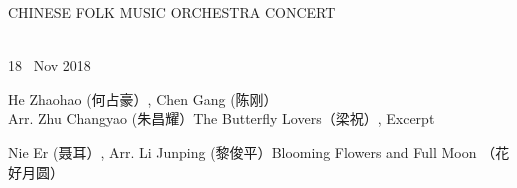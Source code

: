 \documentclass[letter,6pt,poets]{ConcProg}
\begin{document}

\begin{spacing}{1.0} 
\begin{center}
\Huge{C}\large{HINESE } \Huge{F}\large{OLK} \Huge{M}\large{USIC} \Huge{O}\large{RCHESTRA} \Huge{C}\LARGE{ONCERT}
\end{center}
\begin{programme}{
\\  {\normalsize 18 ~Nov 2018}
}
  \begin{part}[]
    \begin{composition}{He Zhaohao (何占豪）, Chen Gang (陈刚） \\Arr. Zhu Changyao (朱昌耀）}{}{The Butterfly Lovers（梁祝）, Excerpt}{}
    \end{composition}
    
    \begin{composition}{Nie Er (聂耳）, Arr. Li Junping (黎俊平）}{}{Blooming Flowers and Full Moon （花好月圆）}{}      
    \end{composition}
    

\end{part}
\end{programme}
\end{spacing}
\end{document}

